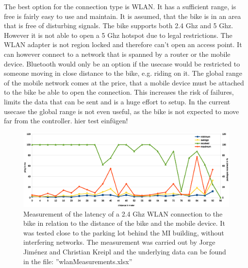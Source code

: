 \documentclass[]{scrreprt}
\begin{document}
	The best option for the connection type is WLAN. It has a sufficient range, is free is fairly easy to use and maintain. It is assumed, that the bike is in an area that is free of disturbing signals. The bike supports both 2.4 Ghz and 5 Ghz. However it is not able to open a 5 Ghz hotspot due to legal restrictions. The WLAN adapter is not region locked and therefore  can't open an access point. It can however connect to a network that is spanned by a router or the mobile device. Bluetooth would only be an option if the usecase would be restricted to someone moving in close distance to the bike, e.g. riding on it. The global range of the mobile network comes at the price, that a mobile device must be attached to the bike be able to open the connection. This increases the risk of failures, limits the data that can be sent and is a huge effort to setup. In the current usecase the global range is not even useful, as the bike is not expected to move far from the controller. 
	 hier test einfügen!
	\begin{figure}[H]
		\includegraphics[width=\linewidth]{images/wlanmeasurement.eps}
		\caption[WLAN latency measurement]{Measurement of the latency of a 2.4 Ghz WLAN connection to the bike in relation to the distance of the bike and the mobile device. It was tested close to the parking lot behind the MI building, without interfering networks.
		The measurement was carried out by Jorge  Jim\'{e}nez and Christian Kreipl and the underlying data can be found in the file: ''wlanMeasurements.xlsx''}
	\end{figure}
	
\end{document}
